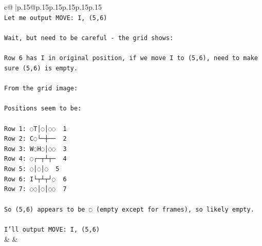 \documentclass{article}
\begin{document}
{\begin{supertabular}{c@{$\;$}|p{.15\linewidth}@{}p{.15\linewidth}p{.15\linewidth}p{.15\linewidth}p{.15\linewidth}p{.15\linewidth}}
{{{\\ 
\texttt{Let me output MOVE: I, (5,6)} \\
\\ 
\texttt{Wait, but need to be careful {-} the grid shows:} \\
\\ 
\texttt{Row 6 has I in original position, if we move I to (5,6), need to make sure (5,6) is empty.} \\
\\ 
\texttt{From the grid image:} \\
\\ 
\texttt{Positions seem to be:} \\
\\ 
\texttt{Row 1: ◌T│◌│◌◌  1} \\
\texttt{Row 2: C◌└─┼──  2} \\
\texttt{Row 3: W◌H◌│◌◌  3} \\
\texttt{Row 4: ◌┌─┬┴┬─  4} \\
\texttt{Row 5: ◌│◌│◌  5} \\
\texttt{Row 6: I└┬┴┬┘◌  6} \\
\texttt{Row 7: ◌◌│◌│◌◌  7} \\
\\ 
\texttt{So (5,6) appears to be ◌ (empty except for frames), so likely empty.} \\
\\ 
\texttt{I'll output MOVE: I, (5,6)} \\
            }
        }
    }
    & & \\ \\


\end{supertabular}}
\end{document}
